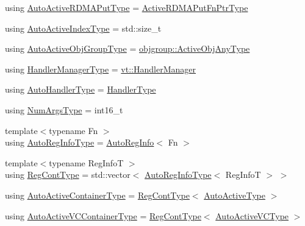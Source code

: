 \begin{DoxyCompactItemize}
\item 
using \hyperlink{namespacevt_1_1auto__registry_a1f67d3efa37b61040b56258ca59df088}{Auto\+Active\+R\+D\+M\+A\+Put\+Type} = \hyperlink{namespacevt_a23220eaaee4345f7371d35e3aee23c70}{Active\+R\+D\+M\+A\+Put\+Fn\+Ptr\+Type}
\item 
using \hyperlink{namespacevt_1_1auto__registry_ad5ff1c3344b954a1e1212c72c74e4a7a}{Auto\+Active\+Index\+Type} = std\+::size\+\_\+t
\item 
using \hyperlink{namespacevt_1_1auto__registry_a861d9d01e89c81f0a955188724aa25b3}{Auto\+Active\+Obj\+Group\+Type} = \hyperlink{namespacevt_1_1objgroup_a25bec5d3c8e8bb02b62280eec62b8ac7}{objgroup\+::\+Active\+Obj\+Any\+Type}
\item 
using \hyperlink{namespacevt_1_1auto__registry_a6014637a7590cbfcd2884a23c3e5b576}{Handler\+Manager\+Type} = \hyperlink{structvt_1_1_handler_manager}{vt\+::\+Handler\+Manager}
\item 
using \hyperlink{namespacevt_1_1auto__registry_ae295e18699146815bb7d7674594d95d7}{Auto\+Handler\+Type} = \hyperlink{namespacevt_af64846b57dfcaf104da3ef6967917573}{Handler\+Type}
\item 
using \hyperlink{namespacevt_1_1auto__registry_aebda1d9d765bc9147dc654ad0712c936}{Num\+Args\+Type} = int16\+\_\+t
\item 
{\footnotesize template$<$typename Fn $>$ }\\using \hyperlink{namespacevt_1_1auto__registry_af3f78826dd69454aeb914a3c7bec0a52}{Auto\+Reg\+Info\+Type} = \hyperlink{structvt_1_1auto__registry_1_1_auto_reg_info}{Auto\+Reg\+Info}$<$ Fn $>$
\item 
{\footnotesize template$<$typename Reg\+InfoT $>$ }\\using \hyperlink{namespacevt_1_1auto__registry_a988a4943e4c8fe82b56f5b13bddceb2b}{Reg\+Cont\+Type} = std\+::vector$<$ \hyperlink{namespacevt_1_1auto__registry_af3f78826dd69454aeb914a3c7bec0a52}{Auto\+Reg\+Info\+Type}$<$ Reg\+InfoT $>$ $>$
\item 
using \hyperlink{namespacevt_1_1auto__registry_a08dc8b065a2c2fd466ae6299eb9ca6b9}{Auto\+Active\+Container\+Type} = \hyperlink{namespacevt_1_1auto__registry_a988a4943e4c8fe82b56f5b13bddceb2b}{Reg\+Cont\+Type}$<$ \hyperlink{namespacevt_1_1auto__registry_adc4d91d5c7fe1b7d36f2c490ae14c9ac}{Auto\+Active\+Type} $>$
\item 
using \hyperlink{namespacevt_1_1auto__registry_a39e866b6d2db660ab9cd9f7cacfa5595}{Auto\+Active\+V\+C\+Container\+Type} = \hyperlink{namespacevt_1_1auto__registry_a988a4943e4c8fe82b56f5b13bddceb2b}{Reg\+Cont\+Type}$<$ \hyperlink{namespacevt_1_1auto__registry_a4a96fdbb11b7be748365fcfc6fc46862}{Auto\+Active\+V\+C\+Type} $>$

\end{DoxyCompactItemize}
